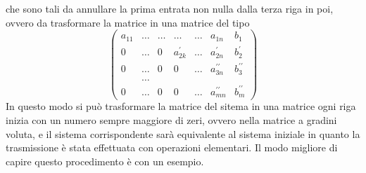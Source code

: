 che sono tali da annullare la prima entrata non nulla dalla terza riga in
poi, ovvero da trasformare la matrice in una matrice del tipo
\begin{equation}
  \label{eq:gauss-jorda6}
  \begin{pmatrix}
    a_{11} & \dots & \dots & \dots & \dots & a_{1n} & b_1\\
    0 & \dots & 0 & a_{2k}^\prime & \dots & a_{2n}^\prime & b_2^\prime\\
    0 & \dots & 0 & 0 & \dots & a_{3n}^{\prime\prime} & b_3^{\prime\prime} \\
           &\dots\\
    0 & \dots & 0 & 0 & \dots & a_{mn}^{\prime\prime} & b_{m}^{\prime\prime}
  \end{pmatrix}
\end{equation}
In questo modo si può trasformare la matrice del sitema in una matrice
ogni riga inizia con un numero sempre maggiore di zeri, ovvero nella
matrice a gradini voluta, e il sistema corrispondente sarà equivalente al
sistema iniziale in quanto la trasmissione è stata effettuata con
operazioni elementari. Il modo migliore di capire questo procedimento è
con un esempio.
